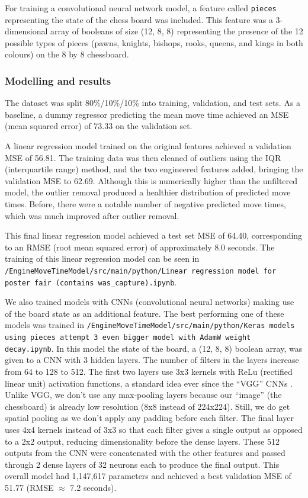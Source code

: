 \documentclass[12pt,titlepage,a4paper]{article}
\begin{document}
    For training a convolutional neural network model, a feature called \texttt{pieces} representing the state of the chess board was included. This feature was a 3-dimensional array of booleans of size (12, 8, 8) representing the presence of the 12 possible types of pieces (pawns, knights, bishops, rooks, queens, and kings in both colours) on the 8 by 8 chessboard.

    \subsubsection{Modelling and results}

    The dataset was split 80\%/10\%/10\% into training, validation, and test
    sets. As a baseline, a dummy regressor predicting the mean move time
    achieved an MSE (mean squared error) of 73.33 on the validation set.

    A linear regression model trained on the original features achieved a
    validation MSE of 56.81. The training data was then cleaned of
    outliers using the IQR (interquartile range) method, and the two engineered features added, bringing the validation MSE to 62.69. Although this is numerically higher than the unfiltered model, the outlier removal produced a
    healthier distribution of predicted move times. Before, there were a notable number of negative predicted move times, which was much improved after outlier removal.

    This final linear regression model achieved a test set MSE of 64.40, corresponding to an RMSE (root mean squared error) of approximately 8.0 seconds. The training of this linear regression model can be seen in \texttt{/EngineMoveTimeModel/src/main/python/Linear regression model for poster fair (contains was\_capture).ipynb}.

    We also trained models with CNNs (convolutional neural networks) making use of the board state as an additional feature. The best performing one of these models was trained in \texttt{/EngineMoveTimeModel/src/main/python/Keras models using pieces attempt 3 even bigger model with AdamW weight decay.ipynb}. In this model the state of the board, a (12, 8, 8) boolean array, was given to a CNN with 3 hidden layers. The number of filters in the layers increase from 64 to 128 to 512. The first two layers use 3x3 kernels with ReLu (rectified linear unit) activation functions, a standard idea ever since the ``VGG'' CNNs \citep{simonyan2015deepconvolutionalnetworkslargescale}. Unlike VGG, we don't use any max-pooling layers because our ``image'' (the chessboard) is already low resolution (8x8 instead of 224x224). Still, we do get spatial pooling as we don't apply any padding before each filter. The final layer uses 4x4 kernels instead of 3x3 so that each filter gives a single output as opposed to a 2x2 output, reducing dimensionality before the dense layers. These 512 outputs from the CNN were concatenated with the other features and passed through 2 dense layers of 32 neurons each to produce the final output. This overall model had 1,147,617 parameters and achieved a best validation MSE of 51.77 (RMSE $\approx$ 7.2 seconds).
\end{document}
